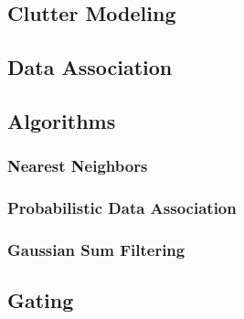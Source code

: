 \documentclass{beamer}
\begin{document}
	\subsection{Clutter Modeling}
	\subsection{Data Association}
	\subsection{Algorithms}
	\subsubsection{Nearest Neighbors}
	\subsubsection{Probabilistic Data Association}
	\subsubsection{Gaussian Sum Filtering}
	\subsection{Gating}
\end{document}
